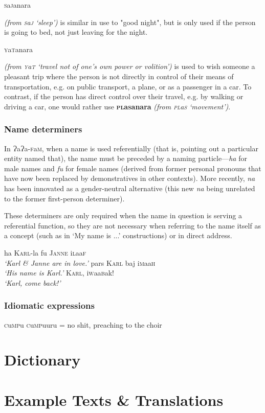 \documentclass[a4paper,10pt,twoside,openright]{memoir}
\newcommand{\lang}{{\bigglot}a{\bigglot}a-\textsc{f}a\textsc{m}}
\newcommand{\bigglot}{Ɂ}
\newcommand{\famwordold}[5]{#1\textsc{#2}#3\textsc{#4}#5}
\begin{document}
\subparagraph{\famwordold{}{s}{a}{j}{anara}} \textit{(from \famwordold{}{s}{a}{j}{} `sleep')} is similar in use to "good night", but is only used if the person is going to bed, not just leaving for the night.

\subparagraph{\famwordold{}{y}{a}{t}{anara}} \textit{(from \famwordold{}{y}{a}{t}{} `travel not of one's own power or volition')} is used to wish someone a pleasant trip where the person is not directly in control of their means of transportation, e.g. on public transport, a plane, or as a passenger in a car. To contrast, if the person has direct control over their travel, e.g. by walking or driving a car, one would rather use \textbf{\famwordold{}{pl}{a}{s}{anara}} \textit{(from \famwordold{}{pl}{a}{s}{} `movement')}.

\section{Name determiners}

In \lang{}, when a name is used referentially (that is, pointing out a particular entity named that), the name must be preceded by a naming particle---\textit{ha} for male names and \textit{fu} for female names (derived from former personal pronouns that have now been replaced by demonstratives in other contexts). More recently, \textit{na} has been innovated as a gender-neutral alternative (this new \textit{na} being unrelated to the former first-person determiner).

These determiners are only required when the name in question is serving a referential function, so they are not necessary when referring to the name itself as a concept (such as in `My name is ...' constructions) or in direct address.

\pex
\a
ha \textsc{Karl}-la fu \textsc{Janne} \famwordold{i}{l}{aa}{f}{}\\
\textit{`Karl \& Janne are in love.'}
\a
pars \textsc{Karl} baj \famwordold{i}{m}{aa}{h}{}\\
\textit{`His name is Karl.'}
\a
\textsc{Karl}, \famwordold{i}{w}{aa}{b}{ak}!\\
\textit{`Karl, come back!'}
\xe


\section{Idiomatic expressions}

\famwordold{}{c}{u}{mp}{u} \famwordold{}{c}{u}{mp}{uuru} = no shit, preaching to the choir

\part{Dictionary}



\part{Example Texts \& Translations}

\end{document}
